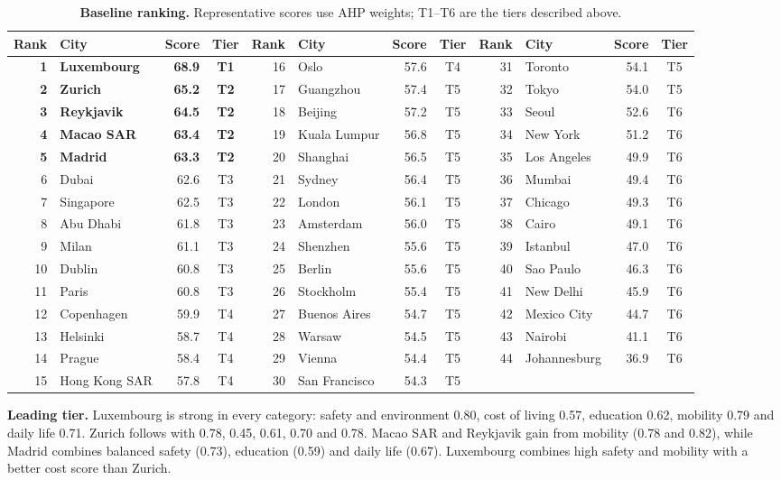 \documentclass{mcmthesis}
\newcommand\hd[1]{{\sffamily\bfseries\color{Navy}#1}}          %
\newcommand\zebra{\rowcolors{2}{Mist}{white}}                    %
\begin{document}
\begin{table}[!htbp]\centering
\caption{\textbf{Baseline ranking.} Representative scores use AHP weights; T1--T6 are the tiers described above.}\label{tab:baseline}
\begingroup\scriptsize\setlength{\tabcolsep}{1pt}\zebra
\begin{tabular}{rlrc@{\qquad}rlrc@{\qquad}rlrc}
\toprule
\hd{Rank}&\hd{City}&\hd{Score}&\hd{Tier}&\hd{Rank}&\hd{City}&\hd{Score}&\hd{Tier}&\hd{Rank}&\hd{City}&\hd{Score}&\hd{Tier}\\\midrule
\textbf{1}&\textbf{Luxembourg}&\textbf{68.9}&\textbf{T1}&16&Oslo&57.6&T4&31&Toronto&54.1&T5\\
\textbf{2}&\textbf{Zurich}&\textbf{65.2}&\textbf{T2}&17&Guangzhou&57.4&T5&32&Tokyo&54.0&T5\\
\textbf{3}&\textbf{Reykjavik}&\textbf{64.5}&\textbf{T2}&18&Beijing&57.2&T5&33&Seoul&52.6&T6\\
\textbf{4}&\textbf{Macao SAR}&\textbf{63.4}&\textbf{T2}&19&Kuala Lumpur&56.8&T5&34&New York&51.2&T6\\
\textbf{5}&\textbf{Madrid}&\textbf{63.3}&\textbf{T2}&20&Shanghai&56.5&T5&35&Los Angeles&49.9&T6\\
6&Dubai&62.6&T3&21&Sydney&56.4&T5&36&Mumbai&49.4&T6\\
7&Singapore&62.5&T3&22&London&56.1&T5&37&Chicago&49.3&T6\\
8&Abu Dhabi&61.8&T3&23&Amsterdam&56.0&T5&38&Cairo&49.1&T6\\
9&Milan&61.1&T3&24&Shenzhen&55.6&T5&39&Istanbul&47.0&T6\\
10&Dublin&60.8&T3&25&Berlin&55.6&T5&40&Sao Paulo&46.3&T6\\
11&Paris&60.8&T3&26&Stockholm&55.4&T5&41&New Delhi&45.9&T6\\
12&Copenhagen&59.9&T4&27&Buenos Aires&54.7&T5&42&Mexico City&44.7&T6\\
13&Helsinki&58.7&T4&28&Warsaw&54.5&T5&43&Nairobi&41.1&T6\\
14&Prague&58.4&T4&29&Vienna&54.4&T5&44&Johannesburg&36.9&T6\\
15&Hong Kong SAR&57.8&T4&30&San Francisco&54.3&T5&&&&\\
\bottomrule\end{tabular}\endgroup\end{table}

\textbf{Leading tier.} Luxembourg is strong in every category: safety and
environment 0.80, cost of living 0.57, education 0.62, mobility 0.79 and daily
life 0.71. Zurich follows with 0.78, 0.45, 0.61, 0.70 and 0.78. Macao SAR and
Reykjavik gain from mobility (0.78 and 0.82), while Madrid combines balanced
safety (0.73), education (0.59) and daily life (0.67). Luxembourg combines
high safety and mobility with a better cost score than Zurich.
\end{document}
